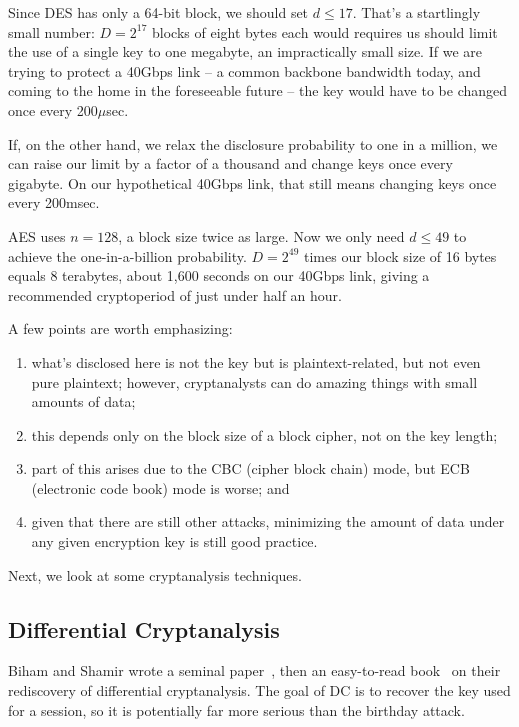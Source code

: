 Since DES has only a 64-bit block, we should set $d \le 17$.  That's a
startlingly small number: $D = 2^{17}$ blocks of eight bytes each
would requires us should limit the use of a single key to one
megabyte, an impractically small size.  If we are trying to protect a
40Gbps link -- a common backbone bandwidth today, and coming to the
home in the foreseeable future -- the key would have to be changed
once every 200$\mu$sec.

If, on the other hand, we relax the disclosure probability to one in a
million, we can raise our limit by a factor of a thousand and change
keys once every gigabyte.  On our hypothetical 40Gbps link, that still
means changing keys once every 200msec.

AES uses $n = 128$, a block size twice as large.  Now we only need $d
\le 49$ to achieve the one-in-a-billion probability.  $D = 2^{49}$
times our block size of 16 bytes equals 8 terabytes, about 1,600
seconds on our 40Gbps link, giving a recommended cryptoperiod of just
under half an hour. 

A few points are worth emphasizing:
\begin{enumerate}
\item what's disclosed here is not the key but is plaintext-related,
  but not even pure plaintext; however, cryptanalysts can do amazing
  things with small amounts of data;
\item this depends only on the block size of a block cipher, not on the
   key length;
\item part of this arises due to the CBC (cipher block chain) mode,
  but ECB (electronic code book) mode is worse; and
\item given that there are still other attacks, minimizing the amount of
   data under any given encryption key is still good practice.
\end{enumerate}

Next, we look at some cryptanalysis techniques.

\subsection{Differential Cryptanalysis}

Biham and Shamir wrote a seminal paper~\cite{biham1991differential},
then an easy-to-read book~\cite{biham1993differential-book} on their
rediscovery of differential cryptanalysis.  The goal of DC is to
recover the key used for a session, so it is potentially far more
serious than the birthday attack.

